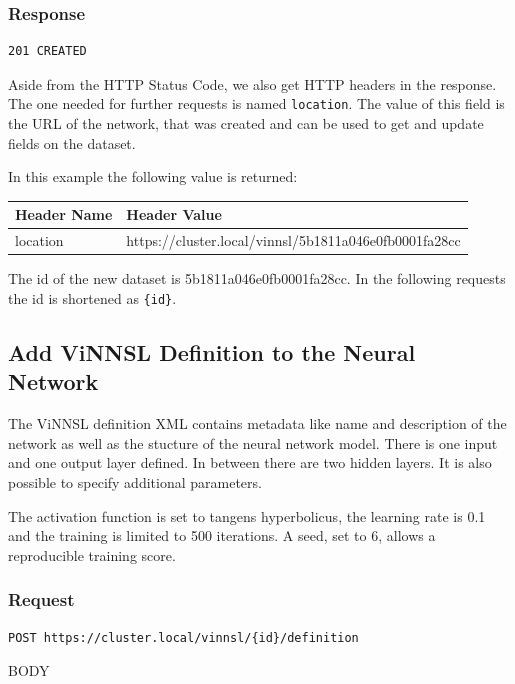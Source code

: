 \subsubsection{Response}\label{response}

\begin{verbatim}
201 CREATED 
\end{verbatim}

Aside from the HTTP Status Code, we also get HTTP headers in the
response. The one needed for further requests is named
\texttt{location}. The value of this field is the URL of the network,
that was created and can be used to get and update fields on the
dataset.

In this example the following value is returned:

\begin{longtable}[]{@{}ll@{}}
\toprule
Header Name & Header Value\tabularnewline
\midrule
\endhead
location &
https://cluster.local/vinnsl/5b1811a046e0fb0001fa28cc\tabularnewline
\bottomrule
\end{longtable}

The id of the new dataset is 5b1811a046e0fb0001fa28cc. In the following
requests the id is shortened as \texttt{\{id\}}.

\subsection{Add ViNNSL Definition to the Neural
Network}\label{add-vinnsl-definition-to-the-neural-network}

The ViNNSL definition XML contains metadata like name and description of
the network as well as the stucture of the neural network model. There
is one input and one output layer defined. In between there are two
hidden layers. It is also possible to specify additional parameters.

The activation function is set to tangens hyperbolicus, the learning
rate is 0.1 and the training is limited to 500 iterations. A seed, set
to 6, allows a reproducible training score.

\subsubsection{Request}\label{request-1}

\begin{verbatim}
POST https://cluster.local/vinnsl/{id}/definition
\end{verbatim}

BODY

